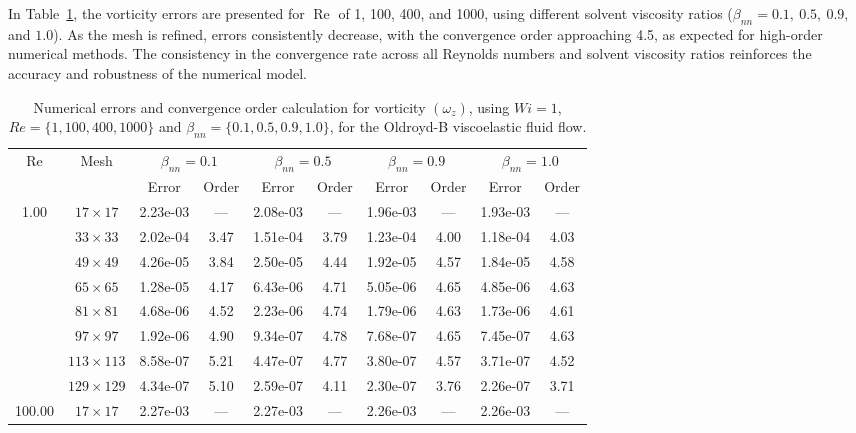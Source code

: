 \documentclass[preprint, 12pt]{elsarticle}
\begin{document}
In Table~\ref{tab_OldroydBWzResumida}, the vorticity errors are presented for $\operatorname{Re}$ of 1, 100, 400, and 1000, using different solvent viscosity ratios ($\beta_{nn} = 0.1,\ 0.5,\ 0.9,$ and $1.0$). As the mesh is refined, errors consistently decrease, with the convergence order approaching 4.5, as expected for high-order numerical methods. The consistency in the convergence rate across all Reynolds numbers and solvent viscosity ratios reinforces the accuracy and robustness of the numerical model.
\begin{center}
\begin{table}[H]
\caption{Numerical errors and convergence order calculation for vorticity $(\omega_{z})$, using \mbox{$Wi=1$}, $Re=\{1,100,400,1000\}$ and $\beta_{nn}=\{0.1,0.5,0.9,1.0\}$, for the Oldroyd-B viscoelastic fluid flow.\label{tab_OldroydBWzResumida}}
\scriptsize{
    \begin{tabular*}{\textwidth}{@{\extracolsep\fill}cccccccccc@{}}
    \hline
    \multirow{2}{*}{$\operatorname{Re}$} & \multirow{2}{*}{Mesh} & \multicolumn{2}{c}{$\beta_{nn}=0.1$}  & \multicolumn{2}{c}{$\beta_{nn}=0.5$}  & \multicolumn{2}{c}{$\beta_{nn}=0.9$}  & \multicolumn{2}{c}{$\beta_{nn}=1.0$}\\ %
     & & Error & Order & Error & Order & Error & Order & Error & Order \\
    \hline
    \multirow{7}{*}{1.00} & $17\times 17$ & 2.23e-03 & --- & 2.08e-03 & --- & 1.96e-03 & --- & 1.93e-03 & --- \\
    & $33\times 33$ & 2.02e-04 & 3.47 & 1.51e-04 & 3.79 & 1.23e-04 & 4.00 & 1.18e-04 & 4.03 \\
    & $49\times 49$ & 4.26e-05 & 3.84 & 2.50e-05 & 4.44 & 1.92e-05 & 4.57 & 1.84e-05 & 4.58 \\
    & $65\times 65$ & 1.28e-05 & 4.17 & 6.43e-06 & 4.71 & 5.05e-06 & 4.65 & 4.85e-06 & 4.63 \\
    & $81\times 81$ & 4.68e-06 & 4.52 & 2.23e-06 & 4.74 & 1.79e-06 & 4.63 & 1.73e-06 & 4.61 \\
    & $97\times 97$ & 1.92e-06 & 4.90 & 9.34e-07 & 4.78 & 7.68e-07 & 4.65 & 7.45e-07 & 4.63 \\
    & $113\times 113$ & 8.58e-07 & 5.21 & 4.47e-07 & 4.77 & 3.80e-07 & 4.57 & 3.71e-07 & 4.52 \\
    & $129\times 129$ & 4.34e-07 & 5.10 & 2.59e-07 & 4.11 & 2.30e-07 & 3.76 & 2.26e-07 & 3.71 \\
    \hline\hline
    \multirow{7}{*}{100.00} & $17\times 17$ & 2.27e-03 & --- & 2.27e-03 & --- & 2.26e-03 & --- & 2.26e-03 & --- \\

\end{tabular*}}
\end{table}
\end{center}
\end{document}
